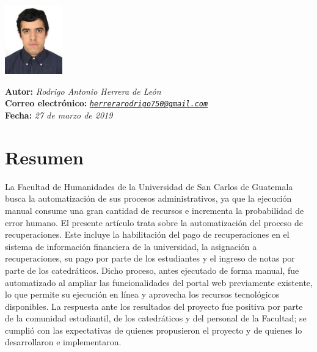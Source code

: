 \documentclass[11pt,spanish,Letterpaper,openany]{book}
\begin{document}
\begin {flushleft}

\begin{tcolorbox}[sharp corners=uphill, colback=fondo, colframe=fondo, arc=6mm, boxrule=0mm, boxsep=2mm,  opacityframe=0.19,  opacityback=0.19]

\begin{minipage}[c]{3cm}

\includegraphics[width=2.5cm,height=\textheight]{images/201901-rherrera-photo.jpg}

\end{minipage}\begin{minipage}[c]{12cm}

\textbf{Autor:} \emph{Rodrigo Antonio Herrera de León}\\
\textbf{Correo electrónico:} \emph{\href{mailto:herrerarodrigo750@gmail.com}{\nolinkurl{herrerarodrigo750@gmail.com}}}\\
\textbf{Fecha:} \emph{27 de marzo de 2019}

\end{minipage}

\end {tcolorbox}

\end {flushleft}

\hypertarget{resumen-3}{%
\section*{Resumen}\label{resumen-3}}

La Facultad de Humanidades de la Universidad de San Carlos de Guatemala busca la automatización de sus procesos administrativos, ya que la ejecución manual consume una gran cantidad de recursos e incrementa la probabilidad de error humano. El presente artículo trata sobre la automatización del proceso de recuperaciones. Este incluye la habilitación del pago de recuperaciones en el sistema de información financiera de la universidad, la asignación a recuperaciones, su pago por parte de los estudiantes y el ingreso de notas por parte de los catedráticos. Dicho proceso, antes ejecutado de forma manual, fue automatizado al ampliar las funcionalidades del portal web previamente existente, lo que permite su ejecución en línea y aprovecha los recursos tecnológicos disponibles. La respuesta ante los resultados del proyecto fue positiva por parte de la comunidad estudiantil, de los catedráticos y del personal de la Facultad; se cumplió con las expectativas de quienes propusieron el proyecto y de quienes lo desarrollaron e implementaron.
\end{document}

